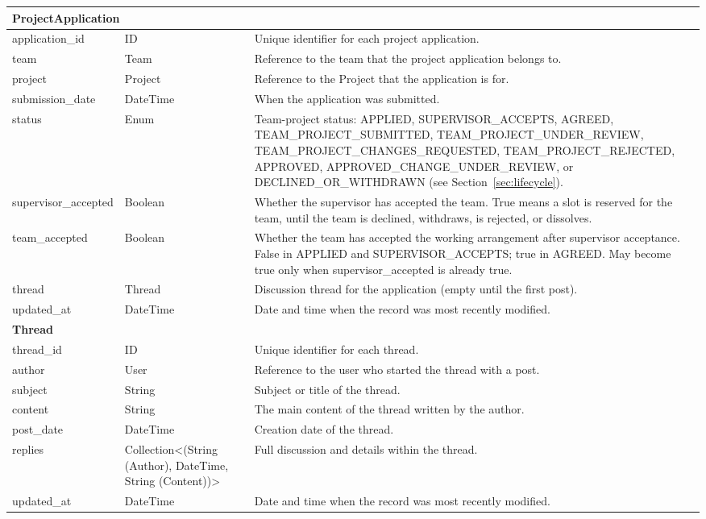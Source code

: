 \documentclass[12pt]{article}
\begin{document}
\begin{longtable}{|
      p{}|
      p{}|
      p{}|
  }
      \multicolumn{3}{|l|}{\textbf{ProjectApplication}}\\ \hline
      application\_id & ID & Unique identifier for each project application. \\ \hline
      team & Team & Reference to the team that the project application belongs to. \\ \hline
      project & Project & Reference to the Project that the application is for. \\ \hline
      submission\_date & DateTime & When the application was submitted. \\ \hline
      status & Enum & Team-project status: APPLIED, SUPERVISOR\_ACCEPTS, AGREED, TEAM\_PROJECT\_SUBMITTED, TEAM\_PROJECT\_UNDER\_REVIEW, TEAM\_PROJECT\_CHANGES\_REQUESTED, TEAM\_PROJECT\_REJECTED, APPROVED, APPROVED\_CHANGE\_UNDER\_REVIEW, or DECLINED\_OR\_WITHDRAWN (see Section~\ref{sec:lifecycle}). \\ \hline
      supervisor\_accepted & Boolean & Whether the supervisor has accepted the team. True means a slot is reserved for the team, until the team is declined, withdraws, is rejected, or dissolves. \\ \hline
      team\_accepted & Boolean & Whether the team has accepted the working arrangement after supervisor acceptance. False in APPLIED and SUPERVISOR\_ACCEPTS; true in AGREED. May become true only when supervisor\_accepted is already true. \\ \hline
      thread & Thread & Discussion thread for the application (empty until the first post). \\ \hline
      updated\_at & DateTime & Date and time when the record was most recently modified. \\ \hline

      \multicolumn{3}{|l|}{\textbf{Thread}}\\ \hline
      thread\_id & ID & Unique identifier for each thread. \\ \hline
      author & User & Reference to the user who started the thread with a post. \\ \hline
      subject & String & Subject or title of the thread. \\ \hline
      content & String & The main content of the thread written by the author. \\ \hline
      post\_date & DateTime & Creation date of the thread. \\ \hline
      replies & Collection\textless (String (Author), DateTime, String (Content))\textgreater & Full discussion and details within the thread. \\ \hline
      updated\_at & DateTime & Date and time when the record was most recently modified. \\ \hline


\end{longtable}
\end{document}
